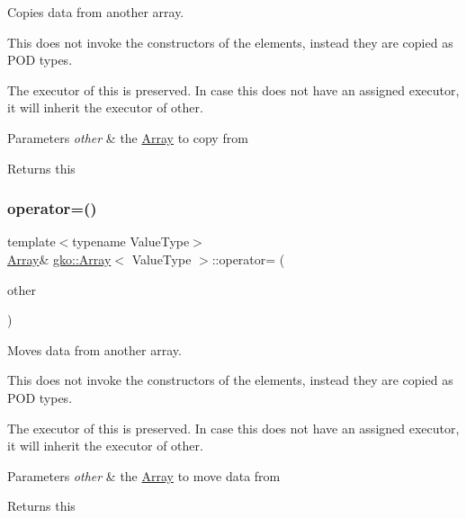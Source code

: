Copies data from another array. 

This does not invoke the constructors of the elements, instead they are copied as P\+OD types.

The executor of this is preserved. In case this does not have an assigned executor, it will inherit the executor of other.


\begin{DoxyParams}{Parameters}
{\em other} & the \hyperlink{classgko_1_1Array}{Array} to copy from\\
\hline
\end{DoxyParams}
\begin{DoxyReturn}{Returns}
this 
\end{DoxyReturn}
\mbox{\label{classgko_1_1Array_a62d5346849e3943a5fcac962e344ab58}} 
\subsubsection{\texorpdfstring{operator=()}{operator=()}\hspace{0.1cm}{\footnotesize\ttfamily [2/2]}}
{\footnotesize\ttfamily template$<$typename Value\+Type$>$ \\
\hyperlink{classgko_1_1Array}{Array}\& \hyperlink{classgko_1_1Array}{gko\+::\+Array}$<$ Value\+Type $>$\+::operator= (\begin{DoxyParamCaption}\item[{\hyperlink{classgko_1_1Array}{Array}$<$ Value\+Type $>$ \&\&}]{other }\end{DoxyParamCaption})}



Moves data from another array. 

This does not invoke the constructors of the elements, instead they are copied as P\+OD types.

The executor of this is preserved. In case this does not have an assigned executor, it will inherit the executor of other.


\begin{DoxyParams}{Parameters}
{\em other} & the \hyperlink{classgko_1_1Array}{Array} to move data from\\
\hline
\end{DoxyParams}
\begin{DoxyReturn}{Returns}
this 
\end{DoxyReturn}
\mbox{\label{classgko_1_1Array_ab42114c635a05ecff66e1ab5e5074d14}} 
